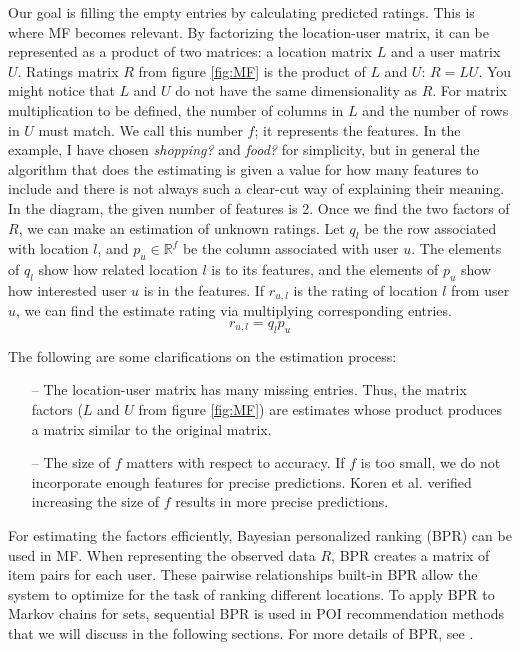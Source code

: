 \documentclass{sig-alternate}
\begin{document}
Our goal is filling the empty entries by calculating predicted ratings. This is where MF becomes
relevant. By factorizing the location-user matrix, it can be represented as a product of two matrices: 
a location matrix $L$ and a user matrix $U$. Ratings matrix $R$ from figure \ref{fig:MF} is the product of $L$ and $U$:  $R = L U$. 
You might notice that $L$ and $U$ do not have the same dimensionality as $R$. For matrix multiplication to be defined, the number of columns in $L$ and the number of rows in $U$ must match.  
We call this number $f$; it represents the features. In the example, I have chosen  \emph{shopping?} and  \emph{food?} for simplicity, 
but in general the algorithm that does the estimating is given a value for how many features to include and there is not always such a clear-cut way of explaining their meaning. In the diagram, the given number of features is 2. Once we find the two 
factors of $R$, we can make an estimation of unknown ratings. Let $q_l$ be the row associated with location $l$, and 
$p_u \in \mathbb{R}^f$ be the column associated with user $u$. The elements of $q_l$ show how related location $l$ is to its features, 
and the elements of $p_u$ show how interested user $u$ is in the features. If $r_{u,l}$ is the rating of location $l$ 
from user $u$, we can find the estimate rating via multiplying corresponding entries. ~\cite{Koren:2009}
\begin{equation}
	r_{u,l}= q_l p_u
\label{eq:MF}
\end{equation}

The following are some clarifications on the estimation process:
\begin{itemize}
\item[--] The location-user matrix has many missing entries. Thus, the matrix factors ($L$ and $U$ from figure \ref{fig:MF}) are 
estimates whose product produces a matrix similar to the original matrix.
\item[--] The size of $f$ matters with respect to accuracy. If $f$ is too small, we do not 
incorporate enough features for precise predictions. Koren et al. \cite{Koren:2009} verified 
increasing the size of $f$ results in more precise predictions.
\end{itemize}

For estimating the factors efficiently, Bayesian personalized ranking (BPR) can be used in MF. 
When representing the observed data $R$, 
BPR creates a matrix of item pairs for each user. These pairwise relationships built-in BPR allow the system 
to optimize for the task of ranking different locations. To apply BPR to Markov chains for sets, 
sequential BPR is used in POI recommendation methods that we will discuss in the following sections.
For more details of BPR, see \cite{Rendle:2009:BBP}.
\end{document}

